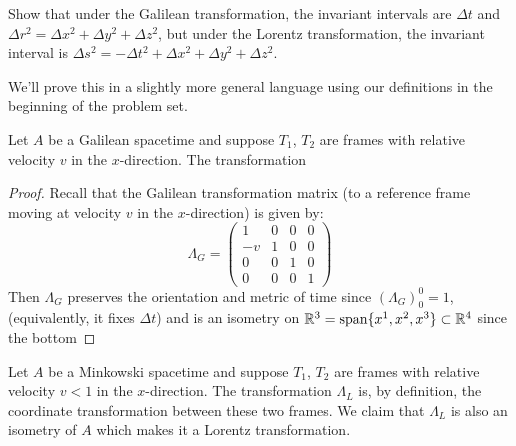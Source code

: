 \documentclass{../../templates/lkx_pset}
\begin{document}
\begin{problem}{5}
Show that under the Galilean transformation, the invariant intervals are $\Delta t$ and $\Delta r^2 =\Delta x^2+ \Delta y^2 + \Delta z^2$, but under the Lorentz transformation, the invariant interval is $\Delta s^2 = -\Delta t^2 + \Delta x^2 + \Delta y^2 + \Delta z^2$.
\end{problem}

\begin{solution}
	We'll prove this in a slightly more general language using our definitions in the beginning of the problem set.
	\begin{claim}
		Let $A$ be a Galilean spacetime and suppose $T_1$, $T_2$ are frames with relative velocity $v$ in the $x$-direction. The transformation
	\end{claim}

	\begin{proof}
	Recall that the Galilean transformation matrix (to a reference frame moving at velocity $v$ in the $x$-direction) is given by:
	\[
		\Lambda_G =
		\begin{pmatrix}
			1  & 0 & 0 & 0 \\
			-v & 1 & 0 & 0 \\
			0  & 0 & 1 & 0 \\
			0  & 0 & 0 & 1
		\end{pmatrix}
	\]
	Then $\Lambda_G$ preserves the orientation and metric of time since $(\Lambda_G)^0_0=1$, (equivalently, it fixes $\Delta t$) and is an isometry on $\mathbb{R}^3=\textrm{span}\{x^1, x^2,x^3\}\subset \mathbb{R}^4$ since the bottom 
	\end{proof}

	\begin{claim}
		Let $A$ be a Minkowski spacetime and suppose $T_1$, $T_2$ are frames with relative velocity $v < 1$ in the $x$-direction. The transformation $\Lambda_{L}$ is, by definition, the coordinate transformation between these two frames. We claim that $\Lambda_{L}$ is also an isometry of $A$ which makes it a Lorentz transformation.
	\end{claim}


\end{solution}
\end{document}
